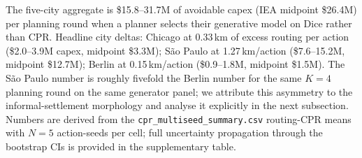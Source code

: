 \documentclass[10pt,a4paper]{article}
\begin{document}
\begin{table}[h]
\centering
\caption{\textbf{Table 2\,\textbar} Excess HV capital expenditure
incurred by acting on the panel-worst non-degenerate generator
rather than the panel-best, per held-out city. Routing-CPR
differences in pixels-per-node converted to kilometres at the
10\,m/px conditioning-grid scale and to dollars at the IEA HV
midpoint of \$2.5M/km (range \$1.5--3.0M; midpoint shown).
\textit{K = 4} substation-siting decisions per round.}
\label{tab:monetary}

\end{table}

\begin{table}[h]
\centering
\caption{\textbf{Table 3\textbar} Capex sensitivity grid. Five-city
aggregate excess-capex gap between the best and worst
non-degenerate generator across $K \in \{2, 4, 8\}$ siting
decisions and three voltage classes (HV, MV, LV) at low / mid /
high \$/km calibrations (IEA + ENTSO-E TYNDP). Replaces the
single-point HV-mid-K=4 headline with the full sensitivity range.}
\label{tab:capex_sensitivity}

\end{table}

The five-city aggregate is \$15.8--31.7M of avoidable capex (IEA
midpoint \$26.4M) per planning round when a planner selects their
generative model on Dice rather than CPR. Headline city
deltas: Chicago at 0.33\,km of excess routing per action (\$2.0--3.9M
capex, midpoint \$3.3M); S\~ao Paulo at 1.27\,km/action
(\$7.6--15.2M, midpoint \$12.7M); Berlin at 0.15\,km/action
(\$0.9--1.8M, midpoint \$1.5M). The S\~ao Paulo number is roughly
fivefold the Berlin number for the same $K = 4$ planning round on
the same generator panel; we attribute this asymmetry to the
informal-settlement morphology and analyse it explicitly in the
next subsection. Numbers are derived from the
\texttt{cpr\_multiseed\_summary.csv} routing-CPR means with
$N = 5$ action-seeds per cell; full uncertainty propagation
through the bootstrap CIs is provided in the supplementary
table.
\end{document}
